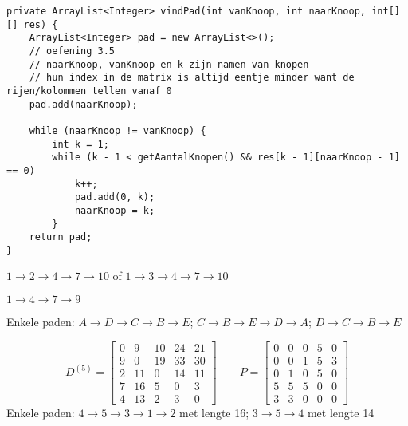 \begin{Oplossing}{9.4}
\begin{lstlisting}[caption=vindPad, label=DijkstravindPad]
private ArrayList<Integer> vindPad(int vanKnoop, int naarKnoop, int[][] res) {
    ArrayList<Integer> pad = new ArrayList<>();
    // oefening 3.5
    // naarKnoop, vanKnoop en k zijn namen van knopen
    // hun index in de matrix is altijd eentje minder want de rijen/kolommen tellen vanaf 0
    pad.add(naarKnoop);

    while (naarKnoop != vanKnoop) {
        int k = 1;
        while (k - 1 < getAantalKnopen() && res[k - 1][naarKnoop - 1] == 0)
            k++;
            pad.add(0, k);
            naarKnoop = k;
        }
    return pad;
}
\end{lstlisting}
\end{Oplossing}
\begin{Oplossing}{10.1}
$1\rightarrow2\rightarrow4\rightarrow7\rightarrow10$
of
$1\rightarrow3\rightarrow4\rightarrow7\rightarrow10$
\end{Oplossing}
\begin{Oplossing}{10.2}
$1\rightarrow4\rightarrow7\rightarrow9$
\end{Oplossing}
\begin{Oplossing}{10.3}
Enkele paden: $A\rightarrow D\rightarrow C\rightarrow B\rightarrow E$;  $C\rightarrow B\rightarrow E\rightarrow D\rightarrow A$; $D\rightarrow C\rightarrow B\rightarrow E$
\end{Oplossing}
\begin{Oplossing}{10.4}
\begin{equation*}
D^{(5)}=\begin{bmatrix}
0 & 9 & 10 & 24 & 21\\
9 & 0 & 19 & 33 & 30\\
2 & 11 & 0 & 14 & 11\\
7 & 16 & 5 & 0 & 3\\
4 & 13 & 2 & 3 &0
\end{bmatrix}
\qquad
P=\begin{bmatrix}
0 & 0 & 0 & 5 & 0\\
0 & 0 & 1 & 5 & 3\\
0 & 1 & 0 & 5 & 0\\
5 & 5 & 5 & 0 & 0\\
3 & 3 & 0 & 0 & 0
\end{bmatrix}
\end{equation*}
Enkele paden: $4 \rightarrow5\rightarrow3\rightarrow1\rightarrow2$ met lengte 16; $3\rightarrow5\rightarrow4$ met lengte 14
\end{Oplossing}
